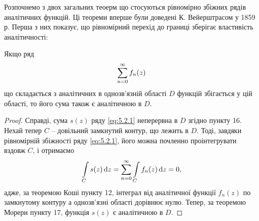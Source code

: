 Розпочнемо з двох загальних теоерм що стосуються рівномірно збіжних рядів аналітичних функцій. Ці теореми вперше були доведені К. Вейерштрасом у 1859 р. Перша з них показує, що рівномірний перехід до границі зберігає властивість аналітичності:
\begin{theorem}
	Якщо ряд 
	\begin{equation}
		\label{eq:5.2.1}
		\displaystyle\sum\limits_{n = 0}^\infty f_n(z)
	\end{equation}
	що складається з аналітичних в однозв'язній області $D$ функцій збігається у цій області, то його сума також є аналітичною в $D$.
\end{theorem}
\begin{proof}
	Справді, сума $s(z)$ ряду \eqref{eq:5.2.1} неперервна в $D$ згідно пункту 16. Нехай тепер $C$ -- довільний замкнутий контур, що лежить в $D$. Тоді, завдяки рівномірній збіжності ряду \eqref{eq:5.2.1}, його можна почленно проінтегрувати вздовж $C$, і отримаємо
	\begin{equation*}
		\displaystyle\int\limits_C s(z) \mathop{}\!\mathrm{d} z = \displaystyle\sum\limits_{n = 0}^\infty \displaystyle\int\limits_C f_n(z) \mathop{}\!\mathrm{d} z = 0,
	\end{equation*}
	адже, за теоремою Коші пункту 12, інтеграл від аналітичної функції $f_n(z)$ по замкнутому контуру а однозв'язні області дорівнює нулю. Тепер, за теоремою Морери пункту 17, функція $s(z)$ є аналітичною в $D$.
\end{proof}

